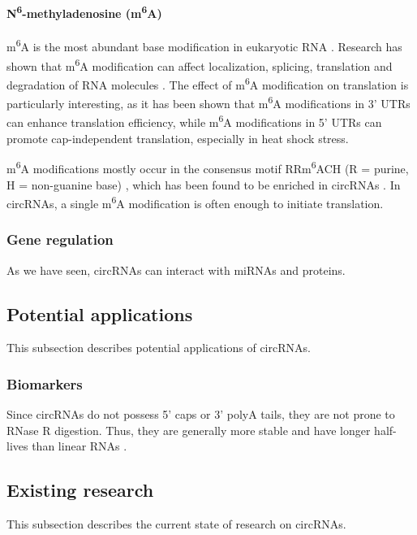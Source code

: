 \paragraph{N\textsuperscript{6}-methyladenosine (m\textsuperscript{6}A)}
m\textsuperscript{6}A is the most abundant base modification in eukaryotic RNA
\supercite{yang_extensive_2017,li_pivotal_2014,wei_methylated_1975}. Research
has shown that m\textsuperscript{6}A modification can affect localization,
splicing, translation and degradation of RNA molecules
\supercite{yue_rna_2015,meyer_dynamic_2014}. The effect of m\textsuperscript{6}A
modification on translation is particularly interesting, as it has been shown
that m\textsuperscript{6}A modifications in 3' UTRs can enhance translation
efficiency\supercite{wang_n6-methyladenosine_2015}, while m\textsuperscript{6}A
modifications in 5' UTRs can promote cap-independent translation, especially in
heat shock stress\supercite{zhou_dynamic_2015,meyer_5_2015}.

m\textsuperscript{6}A modifications mostly occur in the consensus motif
RRm\textsuperscript{6}ACH (R = purine, H = non-guanine base)
\supercite{csepany_sequence_1990,harper_sequence_1990}, which has been found to
be enriched in circRNAs \supercite{yang_extensive_2017}. In circRNAs, a single
m\textsuperscript{6}A modification is often enough to initiate translation\supercite{yang_extensive_2017}.

\subsubsection{Gene regulation}
As we have seen, circRNAs can interact with miRNAs and proteins.

\subsection{Potential applications}
This subsection describes potential applications of circRNAs.

\subsubsection{Biomarkers}
Since circRNAs do not possess 5' caps or 3' polyA tails, they are not prone to
RNase R digestion. Thus, they are generally more stable and have longer
half-lives than linear RNAs \supercite{kristensen_biogenesis_2019}.

\subsection{Existing research}
This subsection describes the current state of research on circRNAs.